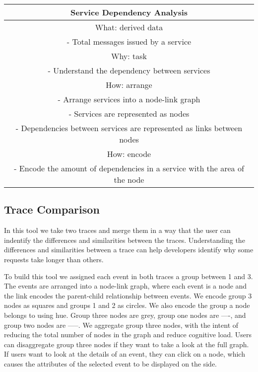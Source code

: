 \begin{center}
    \begin{tabular}{ |c| }
        \hline
        Service Dependency Analysis  \\
        \hline
        What: derived data \\
         - Total messages issued by a service \\
        \hline
        Why: task \\
         - Understand the dependency between services \\
        \hline
        How: arrange\\
         - Arrange services into a node-link graph \\
         - Services are represented as nodes \\
         - Dependencies between services are represented as links between nodes \\
        How: encode \\
         - Encode the amount of dependencies in a service with the area
         of the node 
    \end{tabular}
\end{center}


\subsection{Trace Comparison}

In this tool we take two traces and merge them in a way that the user can indentify the
differences and similarities between the traces. Understanding the differences and similarities
between a trace can help developers identify why some requests take longer than others.

To build this tool we assigned each event in both traces a group between 1 and 3. The events are arranged into a node-link graph,
where each event is a node and the link encodes the parent-child relationship between events. We encode group 3 nodes as squares and groups 1 and 2 as circles.
We also encode the group a node belongs to using hue. Group three nodes are grey, group one nodes are ----, and group two nodes are -----. We aggregate
group three nodes, with the intent of reducing the total number of nodes in the graph and reduce cognitive load. Users can disaggregate group three nodes if they
want to take a look at the full graph. If users want to look at the details of an event, they can click on a node, which causes the attributes of the selected event
to be displayed on the side.


